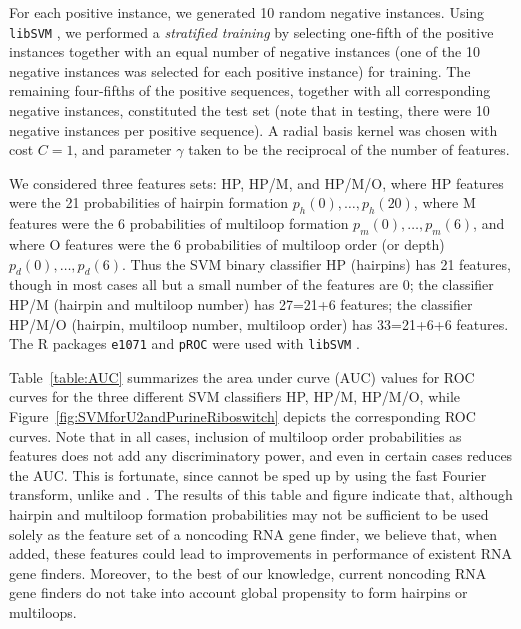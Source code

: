 For each positive instance, we generated 10 random negative instances.
Using {\tt libSVM} \cite{libSVM}, we performed a {\em stratified training}
by selecting one-fifth of the
positive instances together with an equal number of negative instances
(one of the 10 negative instances was selected for each positive instance)
for training. The remaining four-fifths of the positive sequences, together
with all corresponding negative instances, constituted the test set
(note that in testing, there were 10 negative instances per positive sequence).
A radial basis kernel was chosen with cost $C=1$, and parameter $\gamma$
taken to be the reciprocal of the number of features.

We considered three features sets: HP, HP/M, and HP/M/O,
where HP features were the 21 probabilities of hairpin formation
$p_h(0),\ldots,p_h(20)$, where M features were the 6 probabilities of
multiloop formation $p_m(0),\ldots,p_m(6)$, and where O features
were the 6 probabilities of multiloop order (or depth) $p_d(0),\ldots,p_d(6)$.
Thus the SVM binary classifier HP (hairpins) has 21 features, though in
most cases all but a small number of the features are $0$;
the classifier HP/M (hairpin and multiloop number) has
27=21+6 features; the classifier HP/M/O (hairpin, multiloop number,
multiloop order) has 33=21+6+6 features.
The R packages {\tt e1071} \cite{RpackageForSVM} and {\tt pROC} \cite{pROC}
were used with {\tt libSVM} \cite{libSVM}.

Table~\ref{table:AUC} summarizes the area under curve (AUC) values for
ROC curves for the three different SVM classifiers HP, HP/M, HP/M/O,
while Figure~\ref{fig:SVMforU2andPurineRiboswitch} depicts the corresponding
ROC curves. Note that in all cases, inclusion of multiloop order probabilities
as features does not add any discriminatory power, and even in certain cases
reduces the AUC. This is fortunate, since {\rnamlorder} cannot be
sped up by using the fast Fourier transform, unlike {\rnahairpin} and
{\rnamlnumber}. The results of this table and figure indicate that,
although hairpin and multiloop formation probabilities may not be
sufficient to be used solely as the feature set of a noncoding RNA gene
finder, we believe that, when added, these features could lead to improvements
in performance of existent RNA gene finders. Moreover, to the best of our
knowledge, current noncoding RNA gene finders do not take into account
global propensity to form hairpins or multiloops.


